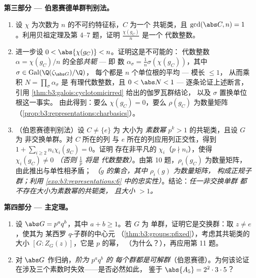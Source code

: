 \begin{problem}
\medskip
\noindent\textbf{第三部分 --- 伯恩赛德单群判别法。}
\begin{enumerate}[resume]
  \item 设 $\chi$ 为次数为 $n$ 的不可约特征标，$C$ 为一个
        共轭类，且 $\gcd(\abs C, n) = 1$。利用贝祖定理及第
        4--7 题，证明 $\frac{\chi(g_C)}{n}$ 是一个
        代数整数。
  \item 进一步设 $0 < \abs{\chi(g_C)} < n$。证明这是不可能的：
        代数整数 $\alpha =
        \chi(g_C)/n$ 的全部\emph{共轭} --- 即
        数 $\alpha_\sigma = \frac1n\sigma(\chi(g_C))$，其中
        $\sigma \in \operatorname{Gal}(\Q(\zeta_{\abs G})/\Q)$，
        每个都是 $n$ 个单位根的平均 --- 模长
        $\leq 1$，
        从而乘积 $N = \prod_\sigma\alpha_\sigma$ 是
        有理代数整数，且 $0 < \abs N < 1$ ---
        逐条论证上述断言，引用
        \cref{thm:b3:galois:cyclotomicirred} 给出的伽罗瓦群结论，
        以及 $\sigma$ 置换单位根这一事实。
        由此得到：要么 $\chi(g_C) = 0$，要么 $\rho(g_C)$
        为数量矩阵（\cref{prop:b3:representations:charbasics}）。
  \item （伯恩赛德判别法）设 $C \neq \{e\}$ 为
        大小为 \emph{素数幂} $p^k > 1$ 的共轭类，且设 $G$ 为
        非交换单群。对 $C$ 所在的列
        与 $e$ 所在的列应用列正交性，得到
        $1 + \sum_{i \geq 2} n_i\chi_i(g_C) = 0$。证明
        存在非平凡的 $\chi_i$（$p \nmid n_i$），使得
        $\chi_i(g_C) \neq 0$ \emph{（否则 $\frac1p$ 将是
        代数整数）}。由第 10 题，$\rho_i(g_C)$
        为数量矩阵，由此推出与单性相矛盾；
        \emph{（$g$ 的集合，其中 $\rho_i(g)$ 为数量矩阵，
        构成正规子群；利用
        \cref{exo:b3:representations:6} 中的忠实性）}。结论：\emph{任一非交换单群
        都不存在大小为素数幂的共轭类，
        且大小 $> 1$。}
\end{enumerate}

\medskip
\noindent\textbf{第四部分 --- 主定理。}
\begin{enumerate}[resume]
  \item 设 $\abs G = p^aq^b$，其中 $a + b \geq 1$。若 $G$ 为
        单群，证明它是交换群：取 $z \neq e$，使其为
        某西罗 $q$-子群的中心元
        （\cref{thm:b3:groups:pfixed}），考虑其共轭类的大小
        $[G : Z_G(z)]$，它是 $p$ 的幂，
        （为什么？），再应用第 11 题。
  \item 对 $\abs G$ 作归纳，\emph{阶为 $p^aq^b$ 的
        每个群都是可解群}（伯恩赛德）。为何该论证
        在涉及三个素数时失效——是否必然如此，
        鉴于 $\abs{A_5} = 2^2\cdot3\cdot5$？
\end{enumerate}


\end{problem}
